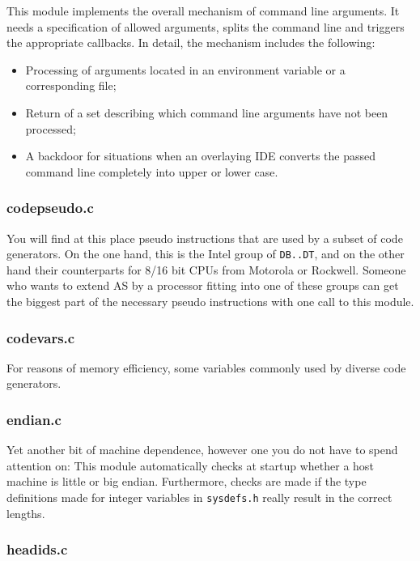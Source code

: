 \documentclass[12pt,twoside]{report}
\newcommand{\tty}[1]{{\tt #1}}
\newcommand{\asname}{{AS}}
\begin{document}
This module implements the overall mechanism of command line arguments.
It needs a specification of allowed arguments, splits the command line and
triggers the appropriate callbacks.   In detail, the mechanism includes
the following:
\begin{itemize}
\item{Processing of arguments located in an environment variable or
      a corresponding file;}
\item{Return of a set describing which command line arguments have not
      been processed;}
\item{A backdoor for situations when an overlaying IDE converts the passed
      command line completely into upper or lower case.}
\end{itemize}

\subsubsection{codepseudo.c}

You will find at this place pseudo instructions that are used by
a subset of code generators.  On the one hand, this is the Intel group of
\tty{DB..DT}, and on the other hand their counterparts for 8/16 bit CPUs
from Motorola or Rockwell.  Someone who wants to extend \asname{} by a
processor fitting into one of these groups can get the biggest part
of the necessary pseudo instructions with one call to this module.

\subsubsection{codevars.c}

For reasons of memory efficiency, some variables commonly used by diverse
code generators.

\subsubsection{endian.c}

Yet another bit of machine dependence, however one you do not have to
spend attention on: This module automatically checks at startup whether
a host machine is little or big endian.  Furthermore, checks are made if
the type definitions made for integer variables in {\tt sysdefs.h} really
result in the correct lengths.

\subsubsection{headids.c}
\end{document}
